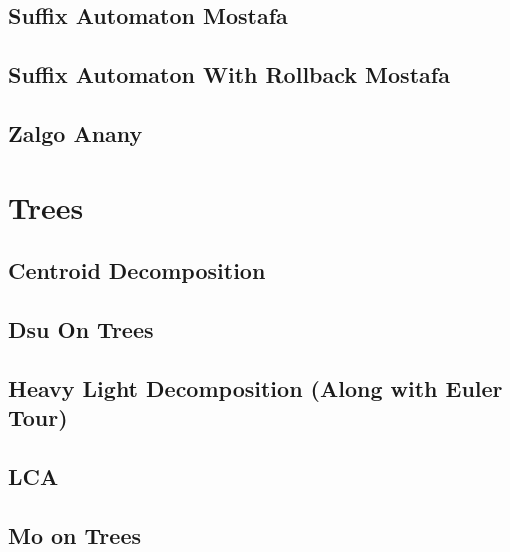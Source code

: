 \subsection{Suffix Automaton Mostafa}
\raggedbottom
\hrulefill
\subsection{Suffix Automaton With Rollback Mostafa}
\raggedbottom
\hrulefill
\subsection{Zalgo Anany}
\raggedbottom
\hrulefill

\section{Trees}
\subsection{Centroid Decomposition}
\raggedbottom
\hrulefill
\subsection{Dsu On Trees}
\raggedbottom
\hrulefill
\subsection{Heavy Light Decomposition (Along with Euler Tour)}
\raggedbottom
\hrulefill
\subsection{LCA}
\raggedbottom
\hrulefill
\subsection{Mo on Trees}
\raggedbottom
\hrulefill

